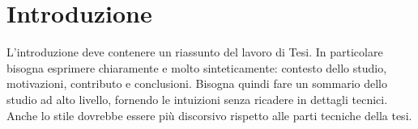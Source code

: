 \chapter{Introduzione}\label{chapter:introduzione} 
L'introduzione deve contenere un riassunto del lavoro di Tesi.
In particolare bisogna esprimere chiaramente e molto sinteticamente: contesto dello studio, motivazioni, contributo e conclusioni.
Bisogna quindi fare un sommario dello studio ad alto livello, fornendo le intuizioni senza ricadere in dettagli tecnici.
Anche lo stile dovrebbe essere più discorsivo rispetto alle parti tecniche della tesi.

